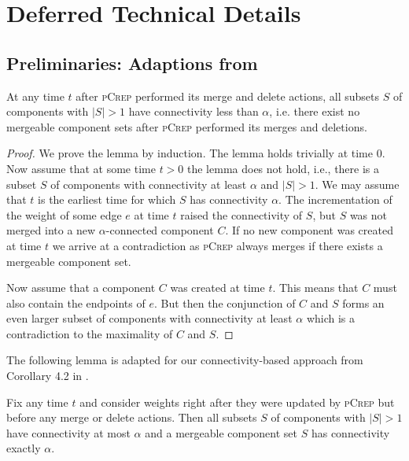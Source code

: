 \documentclass[a4paper,UKenglish,cleveref, autoref, thm-restate,authorcolumns]{../lipics/lipics-v2019}
\newcommand{\adjDel}{\textsc{pCrep}}
\begin{document}



\appendix


\section{Deferred Technical Details}

\subsection{Preliminaries: Adaptions from \cite{Avin2015}}\label{sec:preli}

\begin{lemma}
	\label{mergeableLemma}
	At any time $t$ after \adjDel{} performed its merge and delete actions, all subsets $S$ of components with $|S|>1$ have connectivity less than $\alpha$, i.e. there exist no mergeable component sets after \adjDel{} performed its merges and deletions.
\end{lemma}
\begin{proof}
	We prove the lemma by induction. The lemma holds trivially at time 0.
	Now assume that at some time $t>0$ the lemma does not hold, i.e., there is a subset $S$ of components with connectivity at least $\alpha$ and $|S|>1$. We may assume that $t$ is the earliest time for which $S$ has connectivity $\alpha$.
The incrementation of the weight of some edge $e$ at time $t$ raised the connectivity of $S$, but $S$ was not merged into a new $\alpha$-connected component $C$. If no new component was created at time $t$ we arrive at a contradiction as \adjDel{} always merges if there exists a mergeable component set.
	
	Now assume that a component $C$ was created at time $t$. This means that $C$ must also contain the endpoints of $e$. But then the conjunction of $C$ and $S$ forms an even larger subset of components with connectivity at least $\alpha$ which is a contradiction to the maximality of $C$ and $S$.
\end{proof}

The following lemma is adapted for our connectivity-based approach from Corollary 4.2 in \cite{Avin2015}.

\begin{lemma}
	\label{mergeable_lemma}
	Fix any time $t$ and consider weights right after they were updated by \adjDel{} but before any merge or delete actions. Then all subsets $S$ of components with $|S|>1$ have connectivity at most $\alpha$ and a mergeable component set $S$ has connectivity exactly $\alpha$.
\end{lemma}
\end{document}
